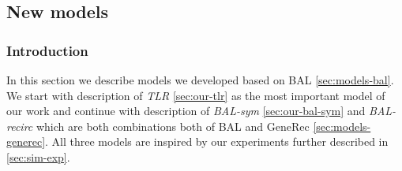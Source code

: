 \subsection{New models}
\label{sec:sim-our} 

\subsubsection*{Introduction} 
In this section we describe models we developed based on BAL \ref{sec:models-bal}. We start with description of \emph{TLR} \ref{sec:our-tlr} as the most important model of our work and continue with description of \emph{BAL-sym} \ref{sec:our-bal-sym} and \emph{BAL-recirc} which are both combinations both of BAL and GeneRec \ref{sec:models-generec}. All three models are inspired by our experiments further described in \ref{sec:sim-exp}. 

 

 



